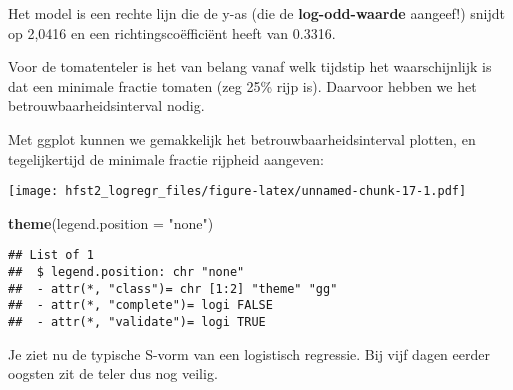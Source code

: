 \documentclass[]{book}
\newenvironment{Shaded}{\begin{snugshade}}{\end{snugshade}}
\newcommand{\KeywordTok}[1]{\textcolor[rgb]{0.13,0.29,0.53}{\textbf{{#1}}}}
\newcommand{\DataTypeTok}[1]{\textcolor[rgb]{0.13,0.29,0.53}{{#1}}}
\newcommand{\DecValTok}[1]{\textcolor[rgb]{0.00,0.00,0.81}{{#1}}}
\newcommand{\FloatTok}[1]{\textcolor[rgb]{0.00,0.00,0.81}{{#1}}}
\newcommand{\StringTok}[1]{\textcolor[rgb]{0.31,0.60,0.02}{{#1}}}
\newcommand{\NormalTok}[1]{{#1}}
\theoremstyle{definition}
\theoremstyle{definition}
\theoremstyle{definition}
\theoremstyle{remark}
\begin{document}
Het model is een rechte lijn die de y-as (die de \textbf{log-odd-waarde}
aangeef!) snijdt op 2,0416 en een richtingscoëfficiënt heeft van 0.3316.

Voor de tomatenteler is het van belang vanaf welk tijdstip het
waarschijnlijk is dat een minimale fractie tomaten (zeg 25\% rijp is).
Daarvoor hebben we het betrouwbaarheidsinterval nodig.

Met ggplot kunnen we gemakkelijk het betrouwbaarheidsinterval plotten,
en tegelijkertijd de minimale fractie rijpheid aangeven:

\begin{Shaded}
\end{Shaded}

\texttt{[image: hfst2\_logregr\_files/figure-latex/unnamed-chunk-17-1.pdf]}

\begin{Shaded}
\begin{Highlighting}[]
  \KeywordTok{theme}\NormalTok{(}\DataTypeTok{legend.position =} \StringTok{"none"}\NormalTok{) }
\end{Highlighting}
\end{Shaded}

\begin{verbatim}
## List of 1
##  $ legend.position: chr "none"
##  - attr(*, "class")= chr [1:2] "theme" "gg"
##  - attr(*, "complete")= logi FALSE
##  - attr(*, "validate")= logi TRUE
\end{verbatim}

Je ziet nu de typische S-vorm van een logistisch regressie. Bij vijf
dagen eerder oogsten zit de teler dus nog veilig.
\end{document}
